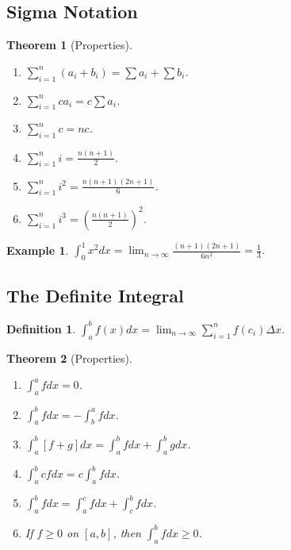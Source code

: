 \documentclass[11pt,a4paper]{article}
\newtheorem{example}{Example}
\newtheorem{theorem}{Theorem}
\newtheorem{definition}{Definition}
\begin{document}
\subsection{Sigma Notation}
\begin{theorem}[Properties]
\begin{enumerate}
\item $\sum_{i=1}^n (a_i + b_i) = \sum a_i + \sum b_i$.
\item $\sum_{i=1}^n c a_i = c \sum a_i$.
\item $\sum_{i=1}^n c = nc$.
\item $\sum_{i=1}^n i = \frac{n(n+1)}{2}$.
\item $\sum_{i=1}^n i^2 = \frac{n(n+1)(2n+1)}{6}$.
\item $\sum_{i=1}^n i^3 = \left(\frac{n(n+1)}{2}\right)^2$.
\end{enumerate}
\end{theorem}
\begin{example}
$\int_0^1 x^2 dx = \lim_{n \to \infty} \frac{(n+1)(2n+1)}{6n^2} = \frac{1}{3}$.
\end{example}
\subsection{The Definite Integral}
\begin{definition}
$\int_a^b f(x) dx = \lim_{n \to \infty} \sum_{i=1}^n f(c_i) \Delta x$.
\end{definition}
\begin{theorem}[Properties]
\begin{enumerate}
\item $\int_a^a f dx = 0$.
\item $\int_a^b f dx = -\int_b^a f dx$.
\item $\int_a^b [f+g] dx = \int_a^b f dx + \int_a^b g dx$.
\item $\int_a^b cf dx = c\int_a^b f dx$.
\item $\int_a^b f dx = \int_a^c f dx + \int_c^b f dx$.
\item If $f \geq 0$ on $[a,b]$, then $\int_a^b f dx \geq 0$.
\end{enumerate}
\end{theorem}
\end{document}
